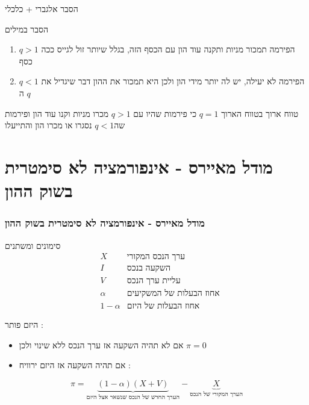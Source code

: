 \documentclass[usenames,dvipsnames]{beamer}
\begin{document}
\begin{RTL}
\begin{frame}[allowframebreaks]
\begin{block}{הסבר אלגברי + כלכלי}
    \end{block}
    \begin{block}{הסבר במילים}
        \begin{enumerate}
            \item $q>1$ הפירמה תמכור מניות ותקנה עוד הון עם הכסף הזה, בגלל שיותר זול לגייס ככה כסף
            \item $q<1$ הפירמה לא יעילה, יש לה יותר מידי הון ולכן היא תמכור את ההון דבר שיגדיל את ה $q$ 
        \end{enumerate}
    \end{block}
   

    \begin{alertblock}{טווח ארוך}
        בטווח הארוך $q=1$ כי פירמות שהיו עם $q>1$ מכרו מניות וקנו עוד הון  ופירמות שה$q<1$ נסגרו או מכרו הון והתייעלו
    \end{alertblock}
\end{frame}
\section{מודל מאיירס - אינפורמציה לא סימטרית בשוק ההון}
\begin{frame}[allowframebreaks]
    \frametitle{מודל מאיירס - אינפורמציה לא סימטרית בשוק ההון}
    \begin{block}{סימונים ומשתנים}
        \begin{align*}
             & X & \text{ערך הנכס המקורי} \\ & I & \text{השקעה בנכס} \\ & V & \text{עליית ערך הנכס} \\ & \alpha & \text{אחוז הבעלות של המשקיעים} \\ & 1-\alpha & \text{אחוז הבעלות של היזם}
         \end{align*}
    \end{block}
    \framebreak
    היזם פותר :
    \begin{itemize}
        \item אם לא תהיה השקעה אז ערך הנכס ללא שינוי ולכן $\pi = 0$
        \item אם תהיה השקעה אז היזם ירוויח : 
    \end{itemize}
    $$\pi = \underbrace{(1-\alpha)\left(X+V\right)}_{\text{הערך החדש של הנכס שנשאר אצל היזם}} - \underbrace{X}_{\text{הערך המקורי של הנכס}}$$
    

\end{frame}
\end{RTL}
\end{document}

